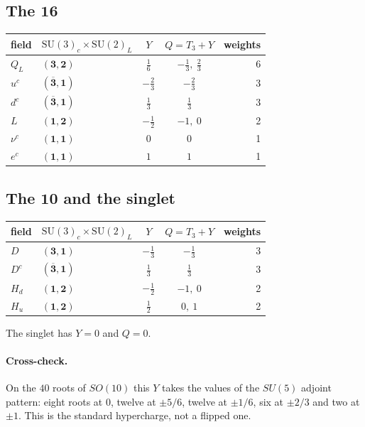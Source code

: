 \documentclass[11pt]{article}
\begin{document}
\subsection*{The $\mathbf{16}$}
\begin{center}
\begin{tabular}{llccr}
\toprule
field & $\mathrm{SU}(3)_c\times\mathrm{SU}(2)_L$ & $Y$ & $Q=T_3+Y$ & weights \\
\midrule
$Q_L$ & $(\mathbf{3},\mathbf{2})$ & $\frac{1}{6}$ & $- \frac{1}{3},\ \frac{2}{3}$ & 6 \\
$u^c$ & $(\overline{\mathbf{3}},\mathbf{1})$ & $- \frac{2}{3}$ & $- \frac{2}{3}$ & 3 \\
$d^c$ & $(\overline{\mathbf{3}},\mathbf{1})$ & $\frac{1}{3}$ & $\frac{1}{3}$ & 3 \\
$L$ & $(\mathbf{1},\mathbf{2})$ & $- \frac{1}{2}$ & $-1,\ 0$ & 2 \\
$\nu ^c$ & $(\mathbf{1},\mathbf{1})$ & $0$ & $0$ & 1 \\
$e^c$ & $(\mathbf{1},\mathbf{1})$ & $1$ & $1$ & 1 \\
\bottomrule
\end{tabular}
\end{center}
\subsection*{The $\mathbf{10}$ and the singlet}
\begin{center}
\begin{tabular}{llccr}
\toprule
field & $\mathrm{SU}(3)_c\times\mathrm{SU}(2)_L$ & $Y$ & $Q=T_3+Y$ & weights \\
\midrule
$D$ & $(\mathbf{3},\mathbf{1})$ & $- \frac{1}{3}$ & $- \frac{1}{3}$ & 3 \\
$D^c$ & $(\overline{\mathbf{3}},\mathbf{1})$ & $\frac{1}{3}$ & $\frac{1}{3}$ & 3 \\
$H_d$ & $(\mathbf{1},\mathbf{2})$ & $- \frac{1}{2}$ & $-1,\ 0$ & 2 \\
$H_u$ & $(\mathbf{1},\mathbf{2})$ & $\frac{1}{2}$ & $0,\ 1$ & 2 \\
\bottomrule
\end{tabular}
\end{center}
The singlet has $Y=0$ and $Q=0$.

\paragraph{Cross-check.}  On the $40$ roots of $SO(10)$ this $Y$ takes the
values of the $SU(5)$ adjoint pattern: eight roots at $0$, twelve at $\pm5/6$,
twelve at $\pm1/6$, six at $\pm2/3$ and two at $\pm1$.  This is the standard
hypercharge, not a flipped one.
\end{document}
